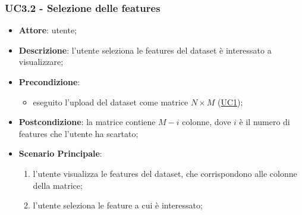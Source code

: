     
    
    
    \subsubsection{UC3.2 - Selezione delle features}
\label{uc4}

    \begin{itemize}
    \item \textbf{Attore}: utente;
    \item \textbf{Descrizione}: l'utente seleziona le features del dataset è interessato a visualizzare;
    \item \textbf{Precondizione}: 
     \begin{itemize}
        \item eseguito l'upload del dataset come matrice $N\times M$ (\hyperref[uc1]{UC1});
    \end{itemize}
    \item \textbf{Postcondizione}: la matrice contiene $M-i$ colonne, dove $i$ è il numero di features che l'utente ha scartato;
    \item \textbf{Scenario Principale}: 
    \begin{enumerate}
        \item l'utente visualizza le features del dataset, che corrispondono alle colonne della matrice;
        \item l'utente seleziona le feature a cui è interessato;
    \end{enumerate}
    \end{itemize}
    
